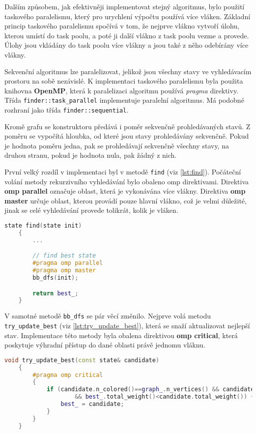 Dalším způsobem, jak efektivněji implementovat stejný algoritmus, bylo použití taskového paralelismu, který pro urychlení výpočtu používá více vláken.
Základní princip taskového paralelismu spočívá v tom, že nejprve vlákno vytvoří úlohu, kterou umístí do task poolu, a poté ji další vlákno z task poolu vezme a provede.
Úlohy jsou vkládány do task poolu více vlákny a jsou také z něho odebírány více vlákny.

Sekvenční algoritmus lze paralelizovat, jelikož jsou všechny stavy ve vyhledávacím prostoru na sobě nezávislé.
K implementaci taskového paralelismu byla použita knihovna \textbf{OpenMP}, která k paralelizaci algoritmu používá \textit{pragma} direktivy.
Třída \texttt{finder::task\_parallel} implementuje paralelní algoritmus.
Má podobné rozhraní jako třída \texttt{finder::sequential}.

Kromě grafu se konstruktoru předává i poměr sekvenčně prohledávaných stavů.
Z poměru se vypočítá hloubka, od které jsou stavy prohledávány sekvenčně.
Pokud je hodnota poměru jedna, pak se prohledávají sekvenčně všechny stavy, na druhou stranu, pokud je hodnota nula, pak žádný z nich.

První velký rozdíl v implementaci byl v metodě \texttt{find} (viz \ref{lst:find}).
Počáteční volání metody rekurzivního vyhledávání bylo obaleno omp direktivami.
Direktiva \textbf{omp parallel} označuje oblast, která je vykonávána více vlákny.
Direktiva \textbf{omp master} určuje oblast, kterou provádí pouze hlavní vlákno, což je velmi důležité, jinak se celé vyhledávání provede tolikrát, kolik je vláken.

\begin{lstlisting}[language=C++, label={lst:find}, caption={Metoda pro nalezení nejlepšího stavu}]
    state find(state init)
    {
        ...

        // find best state
        #pragma omp parallel
        #pragma omp master
        bb_dfs(init);

        return best_;
    }
\end{lstlisting}

V samotné metodě \texttt{bb\_dfs} se pár věcí změnilo.
Nejprve volá metodu \texttt{try\_update\_best} (viz \ref{lst:try_update_best}), která se snaží aktualizovat nejlepší stav.
Implementace této metody byla obalena direktivou \textbf{omp critical}, která poskytuje výhradní přístup do dané oblasti právě jednomu vláknu.

\begin{lstlisting}[language=C++, label={lst:try_update_best}, caption={Metoda pro pokus o aktualizaci nejlepšího stavu}]
    void try_update_best(const state& candidate)
    {
        #pragma omp critical
        {
            if (candidate.n_colored()==graph_.n_vertices() && candidate.subgraph_connected()
                    && best_.total_weight()<candidate.total_weight()) {
                best_ = candidate;
            }
        }
    }
\end{lstlisting}

